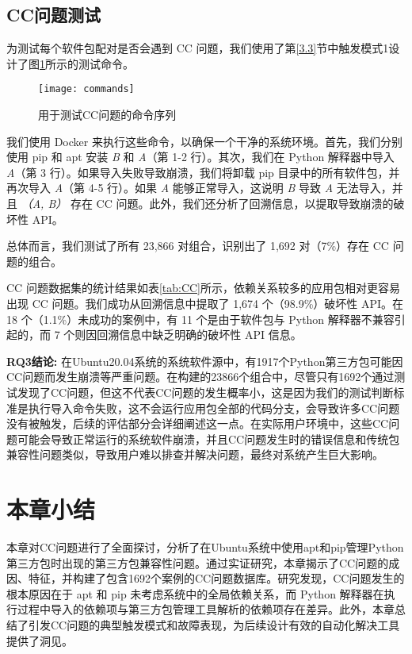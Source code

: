 \subsection{CC问题测试}
为测试每个软件包配对是否会遇到 CC 问题，我们使用了第\ref{3.3}节中触发模式1设计了图\ref{fig:command}所示的测试命令。
\begin{figure}[htbp] %
	\centering
	\texttt{[image: commands]}
	\caption{用于测试CC问题的命令序列}
	\label{fig:command}
\end{figure}
我们使用 Docker  来执行这些命令，以确保一个干净的系统环境。首先，我们分别使用 pip 和 apt 安装 \textit{B} 和 \textit{A}（第 1-2 行）。其次，我们在 Python 解释器中导入 \textit{A}（第 3 行）。如果导入失败导致崩溃，我们将卸载 pip 目录中的所有软件包，并再次导入 \textit{A}（第 4-5 行）。如果 \textit{A} 能够正常导入，这说明 \textit{B} 导致 \textit{A} 无法导入，并且 \textit{（A, B）} 存在 CC 问题。此外，我们还分析了回溯信息，以提取导致崩溃的破坏性 API。

总体而言，我们测试了所有 23,866 对组合，识别出了 1,692 对（7\%）存在 CC 问题的组合。

CC 问题数据集的统计结果如表\ref{tab:CC}所示，依赖关系较多的应用包相对更容易出现 CC 问题。我们成功从回溯信息中提取了 1,674 个（98.9\%）破坏性 API。在 18 个（1.1\%）未成功的案例中，有 11 个是由于软件包与 Python 解释器不兼容引起的，而 7 个则因回溯信息中缺乏明确的破坏性 API 信息。

\begin{tcolorbox}[boxrule=1pt,boxsep=1pt,left=2pt,right=2pt,top=2pt,bottom=2pt]
	\small
	\textcolor{red}{} \noindent\textbf{RQ3结论:} 
	在Ubuntu20.04系统的系统软件源中，有1917个Python第三方包可能因CC问题而发生崩溃等严重问题。在构建的23866个组合中，尽管只有1692个通过测试发现了CC问题，但这不代表CC问题的发生概率小，这是因为我们的测试判断标准是执行导入命令失败，这不会运行应用包全部的代码分支，会导致许多CC问题没有被触发，后续的评估部分会详细阐述这一点。在实际用户环境中，这些CC问题可能会导致正常运行的系统软件崩溃，并且CC问题发生时的错误信息和传统包兼容性问题类似，导致用户难以排查并解决问题，最终对系统产生巨大影响。
\end{tcolorbox} 

\section{本章小结}
本章对CC问题进行了全面探讨，分析了在Ubuntu系统中使用apt和pip管理Python第三方包时出现的第三方包兼容性问题。通过实证研究，本章揭示了CC问题的成因、特征，并构建了包含1692个案例的CC问题数据库。研究发现，CC问题发生的根本原因在于 apt 和 pip 未考虑系统中的全局依赖关系，而 Python 解释器在执行过程中导入的依赖项与第三方包管理工具解析的依赖项存在差异。此外，本章总结了引发CC问题的典型触发模式和故障表现，为后续设计有效的自动化解决工具提供了洞见。